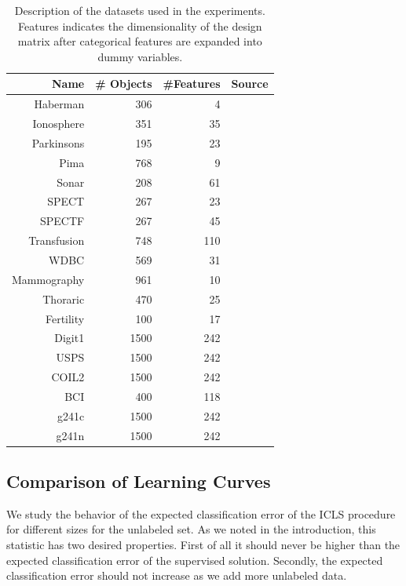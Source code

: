 \documentclass{llncs}
\begin{document}
\begin{table}[ht] 
\caption{Description of the datasets used in the experiments. Features indicates the dimensionality of the design matrix after categorical features are expanded into dummy variables.}
\begin{center}
\begin{tabular}{rrrr}
  \hline
 Name & \# Objects & \#Features & Source \\ 
  \hline
  Haberman & 306 &   4 & \cite{Bache2013} \\ 
  Ionosphere & 351 &  35 & \cite{Bache2013} \\ 
  Parkinsons & 195 &  23 & \cite{Bache2013} \\ 
  Pima & 768 &   9 & \cite{Bache2013} \\ 
  Sonar & 208 &  61 & \cite{Bache2013} \\ 
  SPECT & 267 &  23 & \cite{Bache2013} \\ 
  SPECTF & 267 &  45 & \cite{Bache2013} \\ 
  Transfusion & 748 &   110 & \cite{Bache2013} \\ 
  WDBC & 569 &  31 & \cite{Bache2013} \\
  Mammography & 961 & 10 & \cite{Bache2013} \\
  Thoraric & 470 & 25 & \cite{Bache2013} \\
  Fertility & 100 & 17 & \cite{Bache2013} \\
  Digit1 & 1500 & 242 & \cite{Chapelle2006} \\ 
  USPS & 1500 & 242 & \cite{Chapelle2006}  \\ 
  COIL2 & 1500 & 242 & \cite{Chapelle2006} \\ 
  BCI & 400 & 118 & \cite{Chapelle2006} \\ 
  g241c & 1500 & 242 & \cite{Chapelle2006} \\ 
  g241n & 1500 & 242 & \cite{Chapelle2006} \\ 
   \hline
\end{tabular}
\end{center}

\label{table:datasets}
\end{table}

\subsection{Comparison of Learning Curves}
We study the behavior of the expected classification error of the ICLS procedure for different sizes for the unlabeled set. As we noted in the introduction, this statistic has two desired properties. First of all it should never be higher than the expected classification error of the supervised solution. Secondly, the expected classification error should not increase as we add more unlabeled data. 
\end{document}
